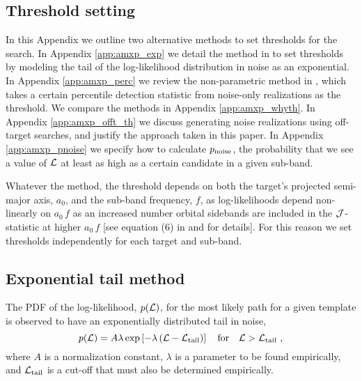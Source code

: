 \begin{subappendices}
	
\section{Threshold setting \label{app:amxp_thresh}}
In this Appendix we outline two alternative methods to set thresholds for the search. In Appendix \ref{app:amxp_exp} we detail the method in \citet{o2vitsco} to set thresholds by modeling the tail of the log-likelihood distribution in noise as an exponential. In Appendix \ref{app:amxp_perc} we review the non-parametric method in \citet{o1vitsco, Middleton2020, Millhouse2020, Jones2021, Beniwal2021}, which takes a certain percentile detection statistic from noise-only realizations as the threshold. We compare the methods in Appendix \ref{app:amxp_whyth}. In Appendix \ref{app:amxp_offt_th} we discuss generating noise realizations using off-target searches, and justify the approach taken in this paper. In Appendix \ref{app:amxp_pnoise} we specify how to calculate $p_{\rm noise}$, the probability that we see a value of $\mathcal{L}$ at least as high as a certain candidate in a given sub-band.

Whatever the method, the threshold depends on both the target's projected semi-major axis, $a_0$, and the sub-band frequency, $f$, as log-likelihoods depend non-linearly on $a_0\, f$ as an increased number orbital sidebands are included in the $\mathcal{J}$-statistic at higher $a_0\, f$ [see equation (6) in \citet{o2vitsco} and \citet{Suvorova2017} for details]. For this reason we set thresholds independently for each target and sub-band. 

\subsection{Exponential tail method  \label{app:amxp_exp}}
The PDF of the log-likelihood, $p(\mathcal{L})$, for the most likely path for a given template is observed to have an exponentially distributed tail in noise,
\begin{equation}
p(\mathcal{L}) = A \lambda \exp \left[-\lambda \left( \mathcal{L} - \mathcal{L}_{\rm tail}\right) \right] \quad {\rm for} \quad \mathcal{L} > \mathcal{L}_{\rm tail}\ , \label{eq:amxp_pl}
\end{equation}
where $A$ is a normalization constant, $\lambda$ is a parameter to be found empirically, and $\mathcal{L}_{\rm tail}$ is a cut-off that must also be determined empirically. 


\end{subappendices}

